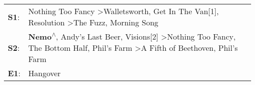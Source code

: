 \begin{supertabular}{p{0.03\textwidth}p{0.92\textwidth}}
 \textbf{S1}:  &                                                                                                         Nothing Too Fancy\textsuperscript{} \textgreater \enspace Walletsworth\textsuperscript{}, \enspace Get In The Van[1]\textsuperscript{}, \enspace Resolution\textsuperscript{} \textgreater \enspace The Fuzz\textsuperscript{}, \enspace Morning Song\textsuperscript{}  \enspace  \\
 \textbf{S2}:  &  \textbf{Nemo\textsuperscript{$\wedge$}}, \enspace Andy's Last Beer\textsuperscript{}, \enspace Visions[2]\textsuperscript{} \textgreater \enspace Nothing Too Fancy\textsuperscript{}, \enspace The Bottom Half\textsuperscript{}, \enspace Phil's Farm\textsuperscript{} \textgreater \enspace A Fifth of Beethoven\textsuperscript{}, \enspace Phil's Farm\textsuperscript{}  \enspace  \\
 \textbf{E1}:  &                                                                                                                                                                                                                                                                                                                                                      Hangover\textsuperscript{}  \enspace  \\
\end{supertabular}
